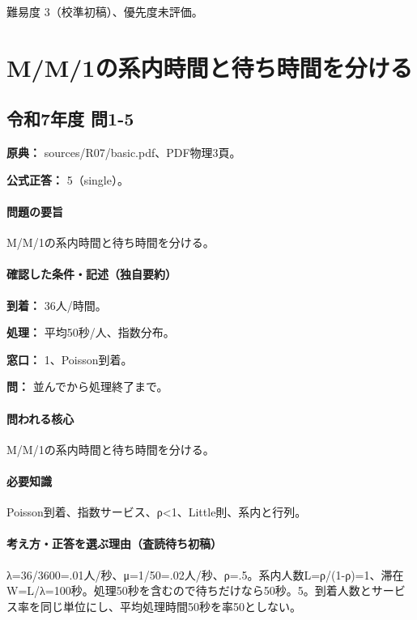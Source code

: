 \par 難易度 3（校準初稿）、優先度未評価。

\section{M/M/1の系内時間と待ち時間を分ける}

\subsection{令和7年度 問1-5}
\label{q:r07-reg-basic-1-5}

\noindent\textbf{原典：} sources/R07/basic.pdf、PDF物理3頁。

\textbf{公式正答：} 5（single）。

\paragraph{問題の要旨} M/M/1の系内時間と待ち時間を分ける。

\paragraph{確認した条件・記述（独自要約）}\mbox{}\par

\noindent\textbf{到着：} 36人/時間。\par

\noindent\textbf{処理：} 平均50秒/人、指数分布。\par

\noindent\textbf{窓口：} 1、Poisson到着。\par

\noindent\textbf{問：} 並んでから処理終了まで。\par

\paragraph{問われる核心} M/M/1の系内時間と待ち時間を分ける。

\paragraph{必要知識} Poisson到着、指数サービス、ρ<1、Little則、系内と行列。

\paragraph{考え方・正答を選ぶ理由（査読待ち初稿）} λ=36/3600=.01人/秒、μ=1/50=.02人/秒、ρ=.5。系内人数L=ρ/(1-ρ)=\allowbreak{}1、滞在W=\allowbreak{}L/λ=100秒。処理50秒を含むので待ちだけなら50秒。5。到着人数とサービス率を同じ単位にし、平均処理時間50秒を率50としない。

